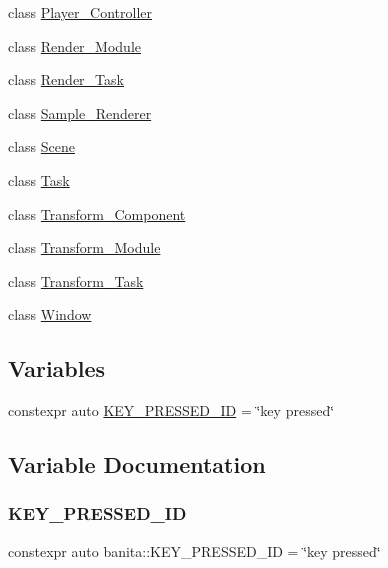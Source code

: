 \begin{DoxyCompactItemize}
class \mbox{\hyperlink{classbanita_1_1_player___controller}{Player\+\_\+\+Controller}}
\item 
class \mbox{\hyperlink{classbanita_1_1_render___module}{Render\+\_\+\+Module}}
\item 
class \mbox{\hyperlink{classbanita_1_1_render___task}{Render\+\_\+\+Task}}
\item 
class \mbox{\hyperlink{classbanita_1_1_sample___renderer}{Sample\+\_\+\+Renderer}}
\item 
class \mbox{\hyperlink{classbanita_1_1_scene}{Scene}}
\item 
class \mbox{\hyperlink{classbanita_1_1_task}{Task}}
\item 
class \mbox{\hyperlink{classbanita_1_1_transform___component}{Transform\+\_\+\+Component}}
\item 
class \mbox{\hyperlink{classbanita_1_1_transform___module}{Transform\+\_\+\+Module}}
\item 
class \mbox{\hyperlink{classbanita_1_1_transform___task}{Transform\+\_\+\+Task}}
\item 
class \mbox{\hyperlink{classbanita_1_1_window}{Window}}
\end{DoxyCompactItemize}
\subsection*{Variables}
\begin{DoxyCompactItemize}
\item 
constexpr auto \mbox{\hyperlink{namespacebanita_abd75c694144bac2707c40f23bf242509}{K\+E\+Y\+\_\+\+P\+R\+E\+S\+S\+E\+D\+\_\+\+ID}} = \char`\"{}key pressed\char`\"{}
\end{DoxyCompactItemize}


\subsection{Variable Documentation}
\mbox{\label{namespacebanita_abd75c694144bac2707c40f23bf242509}} 
\subsubsection{\texorpdfstring{KEY\_PRESSED\_ID}{KEY\_PRESSED\_ID}}
{\footnotesize\ttfamily constexpr auto banita\+::\+K\+E\+Y\+\_\+\+P\+R\+E\+S\+S\+E\+D\+\_\+\+ID = \char`\"{}key pressed\char`\"{}}

